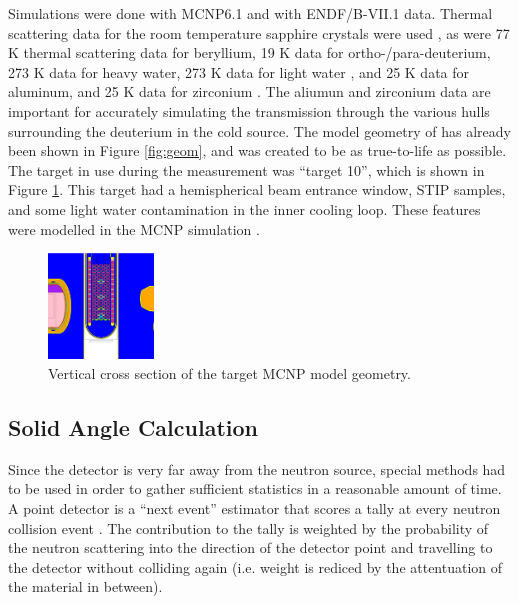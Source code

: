 \documentclass[preprint,12pt]{elsarticle}
\begin{document}
Simulations were done with MCNP6.1 and with ENDF/B-VII.1 data.  Thermal scattering data for the room temperature sapphire crystals were used \cite{sapp}, as were 77 K thermal scattering data for beryllium, 19 K data for ortho-/para-deuterium, 273 K data for heavy water, 273 K data for light water \cite{mcnp6}, and 25 K data for aluminum, and 25 K data for zirconium \cite{IKE}.  The aliumun and zirconium data are important for accurately simulating the transmission through the various hulls surrounding the deuterium in the cold source.  The model geometry of has already been shown in Figure \ref{fig:geom}, and was created to be as true-to-life as possible.  The target in use during the measurement was ``target 10'', which is shown in Figure \ref{fig:target}. This target had a hemispherical beam entrance window, STIP samples, and some light water contamination in the inner cooling loop.  These features were modelled in the MCNP simulation \cite{target10}.

\begin{figure}[h!] 
  \centering
    \includegraphics[width=0.25\textwidth,trim={5cm 0 5cm 0},clip]{graphics/target.eps}
     \caption{Vertical cross section of the target MCNP model geometry. \label{fig:target}}
\end{figure}


\subsection{Solid Angle Calculation}
\label{subsec:solidangle}

Since the detector is very far away from the neutron source, special methods had to be used in order to gather sufficient statistics in a reasonable amount of time.  A point detector is a ``next event'' estimator that scores a tally at every neutron collision event \cite{mcnp}.  The contribution to the tally is weighted by the probability of the neutron scattering into the direction of the detector point and travelling to the detector without colliding again (i.e. weight is rediced by the attentuation of the material in between).  
\end{document}
